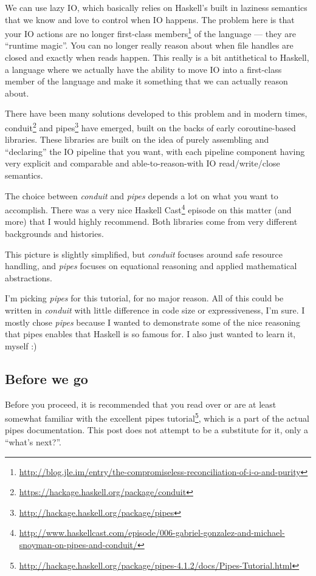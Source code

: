 \documentclass[]{article}
\renewcommand{\href}[2]{#2\footnote{\url{#1}}}
\begin{document}
We can use lazy IO, which basically relies on Haskell's built in laziness
semantics that we know and love to control when IO happens. The problem here is
that your IO actions are no longer
\href{http://blog.jle.im/entry/the-compromiseless-reconciliation-of-i-o-and-purity}{first-class
members} of the language --- they are ``runtime magic''. You can no longer
really reason about when file handles are closed and exactly when reads happen.
This really is a bit antithetical to Haskell, a language where we actually have
the ability to move IO into a first-class member of the language and make it
something that we can actually reason about.

There have been many solutions developed to this problem and in modern times,
\href{https://hackage.haskell.org/package/conduit}{conduit} and
\href{http://hackage.haskell.org/package/pipes}{pipes} have emerged, built on
the backs of early coroutine-based libraries. These libraries are built on the
idea of purely assembling and ``declaring'' the IO pipeline that you want, with
each pipeline component having very explicit and comparable and
able-to-reason-with IO read/write/close semantics.

The choice between \emph{conduit} and \emph{pipes} depends a lot on what you
want to accomplish. There was a very nice
\href{http://www.haskellcast.com/episode/006-gabriel-gonzalez-and-michael-snoyman-on-pipes-and-conduit/}{Haskell
Cast} episode on this matter (and more) that I would highly recommend. Both
libraries come from very different backgrounds and histories.

This picture is slightly simplified, but \emph{conduit} focuses around safe
resource handling, and \emph{pipes} focuses on equational reasoning and applied
mathematical abstractions.

I'm picking \emph{pipes} for this tutorial, for no major reason. All of this
could be written in \emph{conduit} with little difference in code size or
expressiveness, I'm sure. I mostly chose \emph{pipes} because I wanted to
demonstrate some of the nice reasoning that pipes enables that Haskell is so
famous for. I also just wanted to learn it, myself :)

\hypertarget{before-we-go}{%
\subsection{Before we go}\label{before-we-go}}

Before you proceed, it is recommended that you read over or are at least
somewhat familiar with the excellent
\href{http://hackage.haskell.org/package/pipes-4.1.2/docs/Pipes-Tutorial.html}{pipes
tutorial}, which is a part of the actual pipes documentation. This post does not
attempt to be a substitute for it, only a ``what's next?''.
\end{document}

